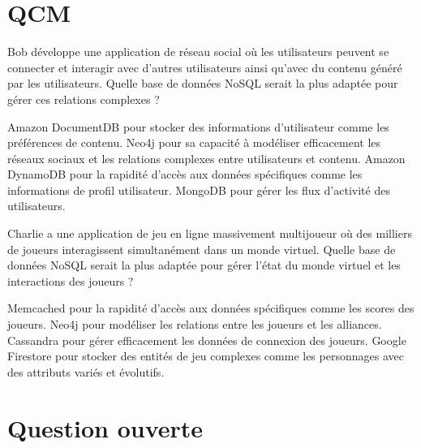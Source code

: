\documentclass[addpoints,answers]{exam}
\begin{document}
	
	\setcounter{page}{1}
	
	
	
	\begin{questions}
		
		\section*{QCM}

		\question[1] Bob développe une application de réseau social où les utilisateurs peuvent se connecter et interagir avec d'autres utilisateurs ainsi qu'avec du contenu généré par les utilisateurs. Quelle base de données NoSQL serait la plus adaptée pour gérer ces relations complexes ?
		\begin{checkboxes}
			\choice Amazon DocumentDB pour stocker des informations d'utilisateur comme les préférences de contenu.
			\CorrectChoice Neo4j pour sa capacité à modéliser efficacement les réseaux sociaux et les relations complexes entre utilisateurs et contenu.
			\choice Amazon DynamoDB pour la rapidité d'accès aux données spécifiques comme les informations de profil utilisateur.
			\choice MongoDB pour gérer les flux d'activité des utilisateurs.
		\end{checkboxes}
				
		\question[1] Charlie a une application de jeu en ligne massivement multijoueur où des milliers de joueurs interagissent simultanément dans un monde virtuel. Quelle base de données NoSQL serait la plus adaptée pour gérer l'état du monde virtuel et les interactions des joueurs ?
		\begin{checkboxes}
			\choice Memcached pour la rapidité d'accès aux données spécifiques comme les scores des joueurs.
			\choice Neo4j pour modéliser les relations entre les joueurs et les alliances.
			\choice Cassandra pour gérer efficacement les données de connexion des joueurs.
			\CorrectChoice Google Firestore pour stocker des entités de jeu complexes comme les personnages avec des attributs variés et évolutifs.
		\end{checkboxes}
		
		
		\section*{Question ouverte}
		
	\end{questions}
	
\end{document}
